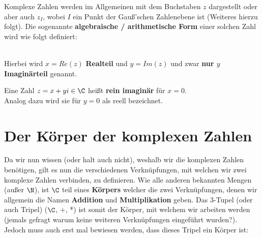 \documentclass[main.tex]{subfiles}
\begin{document}
	\begin{Definition}
		Komplexe Zahlen werden im Allgemeinen mit dem Buchstaben $z$ dargestellt oder aber auch $z_I$, wobei $I$ ein Punkt der Gauß'schen Zahlenebene ist (Weiteres hierzu folgt). Die sogenannte \textbf{algebraische / arithmetische Form} einer solchen Zahl wird wie folgt definiert:
		
		\\
		Hierbei wird $x = Re(z)$ \textbf{Realteil} und $y = Im(z)$ und zwar \textbf{nur $y$ Imaginärteil} genannt.
	\end{Definition}

	\begin{Bemerkung}
		Eine Zahl $z = x + yi \in \C$ heißt \textbf{rein imaginär} für $x = 0$.
		\\
		Analog dazu wird sie für $y = 0$ als reell bezeichnet.
	\end{Bemerkung}


\section{Der Körper der komplexen Zahlen}

	Da wir nun wissen (oder halt auch nicht), weshalb wir die komplexen Zahlen benötigen, gilt es nun die verschiedenen Verknüpfungen, mit welchen wir zwei komplexe Zahlen verbinden, zu definieren. Wie alle anderen bekannten Mengen (außer $\N$), ist $\C$ teil eines \textbf{Körpers} welcher die zwei Verknüpfungen, denen wir allgemein die Namen \textbf{Addition} und \textbf{Multiplikation} geben. Das 3-Tupel (oder auch Tripel) ($\C$, +, *) ist somit der Körper, mit welchem wir arbeiten werden (jemals gefragt warum keine weiteren Verknüpfungen eingeführt wurden?). Jedoch muss auch erst mal bewiesen werden, dass dieses Tripel ein Körper ist:
\end{document}
